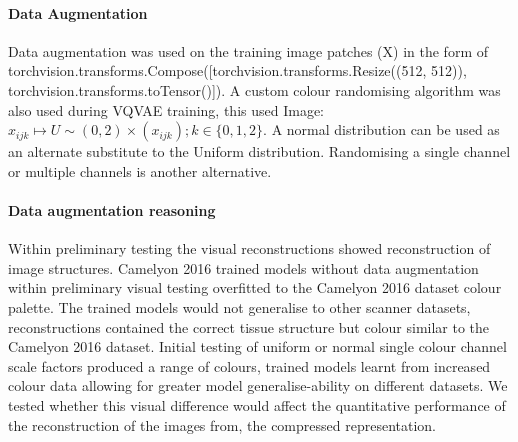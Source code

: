 \documentclass[review]{elsarticle}
\begin{document}
\paragraph{Data Augmentation} Data augmentation was used on the training image patches (X) in the form of torchvision.transforms.Compose([torchvision.transforms.Resize((512, 512)), torchvision.transforms.toTensor()]). A custom colour randomising algorithm was also used during VQVAE training, this used Image:$x_{ijk}\mapsto U\sim(0,2) \times (x_{ijk}); k\in \{0,1,2\}$. A normal distribution can be used as an alternate substitute to the Uniform distribution. Randomising a single channel or multiple channels is another alternative.

\paragraph{Data augmentation reasoning} Within preliminary testing the visual reconstructions showed reconstruction of image structures. Camelyon 2016 trained models without data augmentation within preliminary visual testing overfitted to the Camelyon 2016 dataset colour palette. The trained models would not generalise to other scanner datasets, reconstructions contained the correct tissue structure but colour similar to the Camelyon 2016 dataset. Initial testing of uniform or normal single colour channel scale factors produced a range of colours, trained models learnt from increased colour data allowing for greater model generalise-ability on different datasets. We tested whether this visual difference would affect the quantitative performance of the reconstruction of the images from, the compressed representation.

\end{document}
